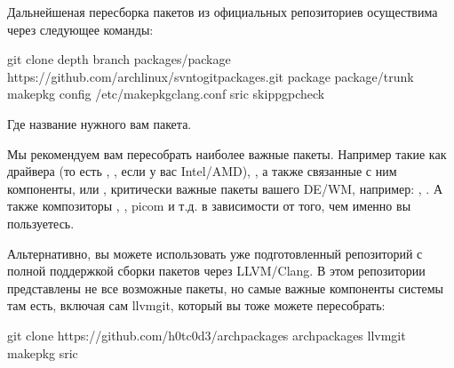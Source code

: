 \documentclass[letterpaper,10pt,russian,openany]{sphinxmanual}
\begin{document}
\sphinxAtStartPar
Дальнейшеная пересборка пакетов из официальных репозиториев осуществима через следующее команды:

\begin{sphinxVerbatim}[commandchars=\\\{\}]
git clone \PYGZhy{}\PYGZhy{}depth  \PYGZhy{}\PYGZhy{}branch packages/package https://github.com/archlinux/svntogit\PYGZhy{}packages.git package
 package/trunk
makepkg \PYGZhy{}\PYGZhy{}config /etc/makepkg\PYGZhy{}clang.conf \PYGZhy{}sric \PYGZhy{}\PYGZhy{}skippgpcheck
\end{sphinxVerbatim}

\sphinxAtStartPar
Где  \sphinxhyphen{} название нужного вам пакета.

\sphinxAtStartPar
Мы рекомендуем вам пересобрать наиболее важные пакеты. Например такие как драйвера (то есть , , если у вас Intel/AMD),
, а также связанные с ним компоненты, или ,
критически важные пакеты вашего DE/WM, например: , .
А также композиторы , , picom и т.д. в зависимости от того, чем именно вы пользуетесь.

\sphinxAtStartPar
Альтернативно, вы можете использовать уже подготовленный репозиторий 
с полной поддержкой сборки пакетов через LLVM/Clang. В этом репозитории представлены не все возможные пакеты, но самые
важные компоненты системы там есть, включая сам llvm\sphinxhyphen{}git, который вы тоже можете пересобрать:

\begin{sphinxVerbatim}[commandchars=\\\{\}]
git clone https://github.com/h0tc0d3/arch\PYGZhy{}packages
 arch\PYGZhy{}packages
 llvm\PYGZhy{}git
makepkg \PYGZhy{}sric
\end{sphinxVerbatim}
\end{document}
